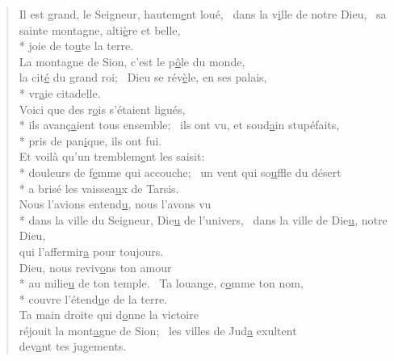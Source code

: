 
\begin{verse}
Il est grand, le Seigneur, hautem\underline{e}nt loué,~\psalmdagger
dans la v\underline{i}lle de notre Dieu,~\psalmstar
{}sa sainte montagne, alti\underline{è}re et belle, \\*
joie de to\underline{u}te la terre. \\

La montagne de Sion, c’est le p\underline{ô}le du monde, \\
la cit\underline{é} du grand roi;~\psalmstar
{}Dieu se rév\underline{è}le, en ses palais, \\*
vr\underline{a}ie citadelle. \\

Voici que des r\underline{o}is s’étaient ligués, \\*
ils avanç\underline{a}ient tous ensemble;~\psalmstar
{}ils ont vu, et soud\underline{a}in stupéfaits, \\*
pris de pan\underline{i}que, ils ont fui. \\

Et voilà qu’un tremblem\underline{e}nt les saisit: \\*
douleurs de f\underline{e}mme qui accouche;~\psalmstar
{}un vent qui so\underline{u}ffle du désert \\*
a brisé les vaissea\underline{u}x de Tarsis. \\

Nous l’avions entend\underline{u}, nous l’avons vu \\*
dans la ville du Seigneur, Die\underline{u} de l’univers,~\psalmstar
dans la ville de Die\underline{u}, notre Dieu, \\
qui l’affermir\underline{a} pour toujours. \\

Dieu, nous reviv\underline{o}ns ton amour \\*
au milie\underline{u} de ton temple.~\psalmstar
{}Ta louange, c\underline{o}mme ton nom, \\*
couvre l’étend\underline{u}e de la terre. \\

Ta main droite qui d\underline{o}nne la victoire \\
réjouit la mont\underline{a}gne de Sion;~\psalmstar
les villes de Jud\underline{a} exultent \\
dev\underline{a}nt tes jugements. \\


\end{verse}
